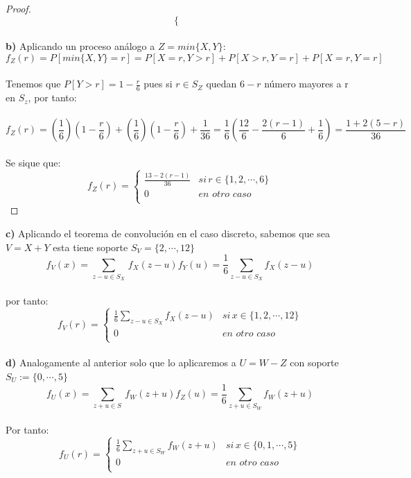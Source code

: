 \documentclass[11pt,letterpaper]{article}
\begin{document}
\begin{proof}
\[\begin{cases}
\end{cases}\]
\,\\
\textbf{b)}\,\,Aplicando un proceso an\'alogo a $Z=min\{X,Y\}$:\,\\
 \begin{equation*}
    f_{Z}(r)=P[min\{X,Y\}=r]=P[X=r,Y>r]+P[X>r,Y=r]+P[X=r,Y=r]
\end{equation*}\,\\
Tenemos que $P[Y>r]=1-\frac{r}{6}$ pues si $r\in S_Z$ quedan $6-r$ n\'umero mayores a r en $S_z$, por tanto:\,\\
\,\\
\begin{equation*}
    f_{Z}(r)=\left(\frac{1}{6}\right)\left(1-\frac{r}{6}\right)+\left(\frac{1}{6}\right)\left(1-\frac{r}{6}\right)+\frac{1}{36}=\frac{1}{6}\left(\frac{12}{6}-\frac{2(r-1)}{6}+\frac{1}{6}\right)=\frac{1+2(5-r)}{36}
\end{equation*}\,\\
Se sique que:
    \[
f_{Z}(r) =
\begin{cases}
\frac{13-2(r-1)}{36} & si\,r\in \{1,2,\cdots,6\}\\
0 & en\,\,otro\,\,caso \\
\end{cases}\]
\end{proof}
\textbf{c)}\,\,Aplicando el teorema de convoluci\'on en el caso discreto, sabemos que sea $V=X+Y$ esta tiene soporte $S_V=\{2,\cdots,12\}$
\begin{equation*}
    f_V(x)=\sum_{z-u\in S_{X}}\,f_{X}(z-u)f_{Y}(u)=\frac{1}{6}\sum_{z-u\in S_X}f_{X}(z-u)
\end{equation*}\,\\
por tanto:\,\\
\[
f_{V}(r) =
\begin{cases}
\frac{1}{6}\sum_{z-u\in S_X}f_{X}(z-u) & si\,x\in \{1,2,\cdots,12\}\\
0 & en\,\,otro\,\,caso \\
\end{cases}\]\,\\
\textbf{d)}\,\,Analogamente al anterior solo que lo aplicaremos a $U=W-Z$ con soporte $S_{U}:=\{0,\cdots,5\}$
\,\\
\begin{equation*}
      f_U(x)=\sum_{z+u\in S_{}}\,f_{W}(z+u)f_{Z}(u)=\frac{1}{6}\sum_{z+u\in S_W}f_{W}(z+u)
\end{equation*}\,\\
Por tanto:\,\\
\[
f_{U}(r) =
\begin{cases}
\frac{1}{6}\sum_{z+u\in S_W}f_{W}(z+u) & si\,x\in \{0,1,\cdots,5\}\\
0 & en\,\,otro\,\,caso \\
\end{cases}\]\,\\
\end{document}
